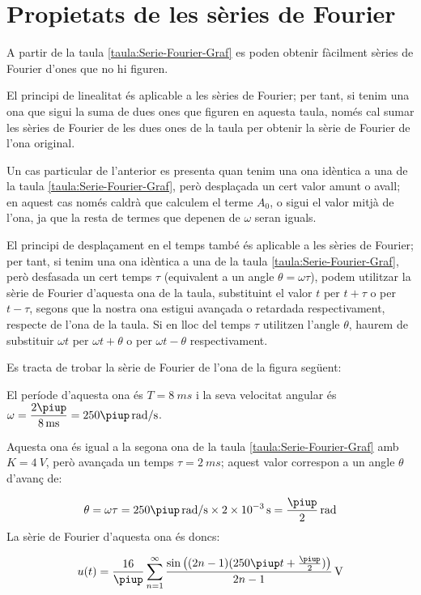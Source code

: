 \section{Propietats de les sèries de Fourier}

A partir de la taula \vref{taula:Serie-Fourier-Graf} es poden obtenir fàcilment sèries de Fourier d'ones que no hi figuren.

El principi de linealitat és aplicable a les sèries de Fourier; per tant, si tenim una ona que sigui la suma de dues ones que figuren en aquesta taula, només  cal sumar les sèries de Fourier de les dues ones de la taula per obtenir la sèrie de Fourier de l'ona original.

Un cas particular de l'anterior es presenta quan tenim una ona  idèntica a una de la taula \ref{taula:Serie-Fourier-Graf}, però desplaçada un cert valor amunt o avall; en aquest cas només caldrà que calculem el terme $A_0$, o sigui el valor mitjà de l'ona, ja que la resta de termes que depenen de $\omega$ seran iguals.

El principi de desplaçament en el temps també és aplicable a les sèries de Fourier; per tant, si tenim una ona idèntica a una de la taula \ref{taula:Serie-Fourier-Graf}, però desfasada un cert temps $\tau$ (equivalent a un angle $\theta = \omega \tau$), podem utilitzar la sèrie de Fourier d'aquesta ona de la taula, substituint el valor $t$ per $t+\tau$ o per $t-\tau$, segons que la nostra ona estigui avançada o retardada respectivament, respecte de l'ona de la taula. Si en lloc del temps $\tau$ utilitzen l'angle $\theta$, haurem de substituir  $\omega t$ per $\omega t + \theta$ o per $\omega t - \theta$ respectivament.


\begin{exemple}[\SerieFouTaulaFormes{}]
	\addcontentsxms{\SerieFouTaulaFormes}
    Es tracta de trobar la sèrie de Fourier de l'ona de la figura següent:
    \begin{center}
        
    \end{center}

    El període d'aquesta ona és $T=\qty{8}{ms}$ i la seva velocitat angular és $\omega = \dfrac{2\piup}{\qty{8}{ms}} = 250 \piup\unit{\,rad/s}$.

    Aquesta ona és igual a la segona ona de la taula \vref{taula:Serie-Fourier-Graf} amb $K=\qty{4}{V}$, però avançada un temps $\tau=\qty{2}{ms}$; aquest valor correspon a un angle $\theta$ d'avanç de:

    \[
        \theta = \omega \tau = 250\piup\unit{\,rad/s} \times \qty{2e-3}{s} = \frac{\piup}{2}\unit{\,rad}
    \]
    La sèrie de Fourier d'aquesta ona és doncs:

    \[
    u(t) = \frac{{16}}{\piup }\sum\limits_{n = 1}^\infty  {\frac{{\sin \big((2n - 1)(250\piup t+ \frac{\piup}{2})\big)}}{{2n - 1}}} \,\text{V}
    \]
\end{exemple}

